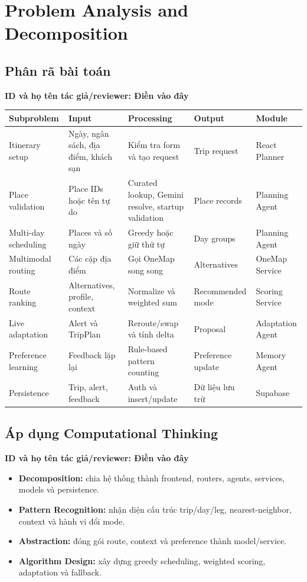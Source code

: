 \documentclass[12pt,a4paper,oneside]{report}
\newcommand{\tacgia}{%
  \begin{tcolorbox}[colback=blue!3,colframe=blue!25,boxrule=0.4pt,arc=1mm]
    \small\textbf{ID và họ tên tác giả/reviewer: Điền vào đây}
  \end{tcolorbox}
}
\begin{document}
\chapter{Problem Analysis and Decomposition}
\section{Phân rã bài toán}
\tacgia
\begin{longtable}{p{3cm}p{3cm}p{4.5cm}p{3cm}p{3cm}}
\toprule
\textbf{Subproblem} & \textbf{Input} & \textbf{Processing} & \textbf{Output} & \textbf{Module} \\
\midrule
Itinerary setup & Ngày, ngân sách, địa điểm, khách sạn & Kiểm tra form và tạo request & Trip request & React Planner \\
Place validation & Place IDs hoặc tên tự do & Curated lookup, Gemini resolve, startup validation & Place records & Planning Agent \\
Multi-day scheduling & Places và số ngày & Greedy hoặc giữ thứ tự & Day groups & Planning Agent \\
Multimodal routing & Các cặp địa điểm & Gọi OneMap song song & Alternatives & OneMap Service \\
Route ranking & Alternatives, profile, context & Normalize và weighted sum & Recommended mode & Scoring Service \\
Live adaptation & Alert và TripPlan & Reroute/swap và tính delta & Proposal & Adaptation Agent \\
Preference learning & Feedback lặp lại & Rule-based pattern counting & Preference update & Memory Agent \\
Persistence & Trip, alert, feedback & Auth và insert/update & Dữ liệu lưu trữ & Supabase \\
\bottomrule
\end{longtable}

\section{Áp dụng Computational Thinking}
\tacgia
\begin{itemize}
  \item \textbf{Decomposition:} chia hệ thống thành frontend, routers, agents, services, models và persistence.
  \item \textbf{Pattern Recognition:} nhận diện cấu trúc trip/day/leg, nearest-neighbor, context và hành vi đổi mode.
  \item \textbf{Abstraction:} đóng gói route, context và preference thành model/service.
  \item \textbf{Algorithm Design:} xây dựng greedy scheduling, weighted scoring, adaptation và fallback.
\end{itemize}
\end{document}

